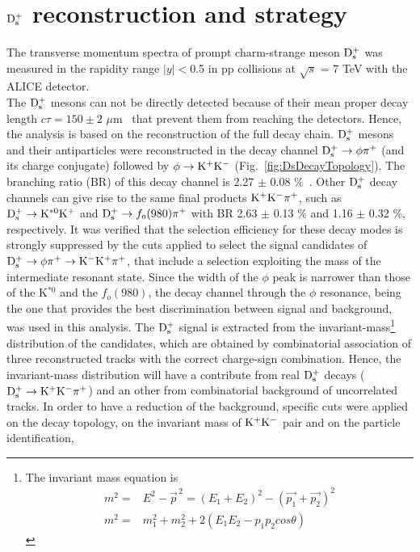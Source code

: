 \section{${\rm D_s^+}$ reconstruction and strategy}
The transverse momentum spectra of prompt charm-strange meson 
${\rm D_s^+}$ was measured in the rapidity range $|y| < $0.5 in pp collisions at 
$\sqrt{s}$ = 7 TeV with the ALICE detector.\\
The ${\rm D_s^+}$ mesons can not be directly detected because of 
their mean proper decay length $c\tau = 150\pm 2$ $ \mu$m~\cite{Olive:2016xmw} 
that prevent them from reaching the detectors. Hence, the analysis is 
based on the reconstruction of the full decay chain.
${\rm D_s^+}$ mesons and their antiparticles were 
 reconstructed in the decay channel ${\rm D_s^{+}\to \phi\pi^+}$ 
 (and its charge conjugate) followed by ${\phi \to {\rm K^+ K^-}}$ 
 (Fig.~\ref{fig:DsDecayTopology}). The branching ratio (BR) of this decay channel 
 is 2.27 $\pm$ 0.08 \%~\cite{Olive:2016xmw}.
Other ${\rm D_s^+}$ decay channels can give rise to the same final products
 ${\rm K^+ K^-}\pi^+$, such as ${\rm D_s^+}\rightarrow {\rm  K^{*0} K^+}$ and 
 ${\rm D_s^+}\rightarrow f_o(980) \pi^+$ with BR  2.63 $\pm$ 0.13 \% and 
 1.16 $\pm$ 0.32 \%, respectively. It was verified that the selection efficiency for 
 these decay modes is strongly suppressed by the cuts applied 
 to select the signal candidates of ${\rm D_s^{+}\to \phi\pi^+\to K^-K^+\pi^+}$, that include 
 a selection exploiting the mass of the intermediate resonant state. 
 Since the width of the $\phi$ peak is narrower than those of the 
 K$^{*0}$ and the $f_o(980)$, the decay channel through the 
 $\phi$ resonance, being the one that provides the best discrimination 
 between signal and background, was used in this analysis. 
 The ${\rm D_s^+}$ signal is extracted from 
 the invariant-mass\footnote{The invariant mass equation is \\ 
 \begin{align*} m^2 =& E^2 -\vec{p}^{\, 2} = (E_1 + E_2)^2 -(\vec{p_1} + \vec{p_2})^2 \\ m^2 =& m_1^2 +m_2^2 + 2(E_1E_2 -p_1p_2cos\theta) \end{align*}} 
 distribution of the candidates, which are obtained by 
 combinatorial association of three reconstructed tracks with the correct 
 charge-sign combination. Hence, 
 the invariant-mass distribution will have a contribute from real 
 ${\rm D_s^+}$ decays (${\rm D^{+}_\mathrm{s}\to K^+ K^-\pi^+}$) and an other 
 from combinatorial background of uncorrelated tracks. In order to have a reduction of the
  background, specific cuts were applied on the decay topology, on
   the invariant mass of ${\rm K^+ K^-}$ pair and on the particle identification, 
